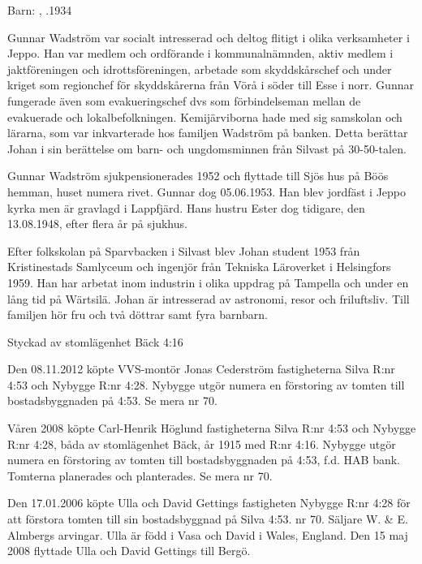 Barn:	, .1934

Gunnar Wadström var socialt intresserad och deltog flitigt i olika verksamheter i Jeppo. Han var medlem och	ordförande 	i kommunalnämnden, aktiv medlem i jaktföreningen och idrottsföreningen, arbetade som skyddskårschef och under kriget som regionchef för skyddskårerna från Vörå i söder till Esse i norr. Gunnar fungerade även som evakueringschef dvs som förbindelseman mellan de evakuerade och lokalbefolkningen. Kemijärviborna hade med sig samskolan och lärarna, som var inkvarterade hos familjen Wadström på banken. Detta berättar Johan i sin berättelse om barn- och ungdomsminnen från Silvast på 30-50-talen.

Gunnar Wadström sjukpensionerades 1952 och flyttade till Sjös hus på Böös hemman, huset numera rivet. Gunnar dog 05.06.1953. Han blev jordfäst i Jeppo kyrka men är gravlagd i Lappfjärd. Hans hustru Ester dog tidigare, den 13.08.1948, efter flera år på sjukhus.

Efter folkskolan på Sparvbacken i Silvast blev Johan student 1953 från Kristinestads Samlyceum och ingenjör från Tekniska Läroverket i Helsingfors 1959. Han har arbetat inom industrin i olika uppdrag på Tampella och under en lång tid på Wärtsilä. Johan är intresserad av astronomi,	resor och friluftsliv. Till familjen hör fru och två döttrar samt fyra barnbarn.



%

Styckad av stomlägenhet Bäck 4:16

%
Den 08.11.2012 köpte VVS-montör Jonas Cederström fastigheterna Silva R:nr 4:53 och Nybygge R:nr 4:28. Nybygge utgör numera en förstoring av tomten till bostadsbyggnaden på 4:53. Se mera nr 70.


%
Våren 2008 köpte Carl-Henrik Höglund fastigheterna Silva R:nr 4:53 och Nybygge R:nr 4:28, båda av stomlägenhet Bäck, år 1915 med R:nr 4:16. Nybygge utgör numera en förstoring av tomten till bostadsbyggnaden på 4:53, f.d. HAB bank. Tomterna planerades och planterades. Se mera nr 70.


%
Den 17.01.2006 köpte Ulla och David Gettings fastigheten Nybygge R:nr 4:28 för att förstora tomten till sin		bostadsbyggnad på Silva 4:53. nr 70. Säljare W. \& E. Almbergs arvingar. Ulla är född i Vasa och David i Wales, England. Den 15 maj 2008 flyttade Ulla och David Gettings till Bergö.


